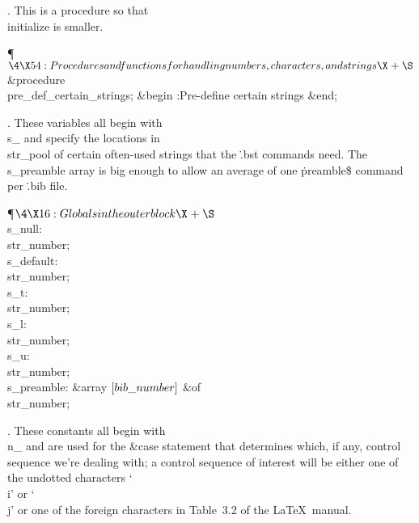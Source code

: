 .
This is a procedure so that \\{initialize} is smaller.

\Y\P$\4\X54:Procedures and functions for handling numbers, characters, and
strings\X\mathrel{+}\S$\6
\4\&{procedure}\1\  \\{pre\_def\_certain\_strings};\2\6
\&{begin} :Pre-define certain strings\X\6
\&{end};\par
\fi

.
These variables all begin with \\{s\_} and specify the locations in
\\{str\_pool} of certain often-used strings that the \.{.bst} commands
need.  The \\{s\_preamble} array is big enough to allow an average of one
\.{preamble\$} command per \.{.bib} file.

\Y\P$\4\X16:Globals in the outer block\X\mathrel{+}\S$\6
\4\\{s\_null}: \\{str\_number};\6
\4\\{s\_default}: \\{str\_number};\6
\4\\{s\_t}: \\{str\_number};%
\6
\4\\{s\_l}: \\{str\_number};\6
\4\\{s\_u}: \\{str\_number};\6
\4\\{s\_preamble}: \&{array} $[\\{bib\_number}]$ \1\&{of}\5
\\{str\_number};\2\par
\fi

.
These constants all begin with \\{n\_} and are used for the   \&{case}
statement that determines which, if any, control sequence we're
dealing with; a control sequence of interest will be either one of the
undotted characters `\.{\\i}' or `\.{\\j}' or one of the foreign
characters in Table~3.2 of the \LaTeX\ manual.

